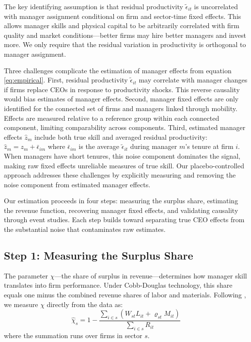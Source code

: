 \documentclass[11pt,a4paper]{article}
\begin{document}
The key identifying assumption is that residual productivity $\tilde{\epsilon}_{it}$ is uncorrelated with manager assignment conditional on firm and sector-time fixed effects. This allows manager skills and physical capital to be arbitrarily correlated with firm quality and market conditions—better firms may hire better managers and invest more. We only require that the residual variation in productivity is orthogonal to manager assignment.

Three challenges complicate the estimation of manager effects from equation \eqref{eq:empirical}. First, residual productivity $\tilde{\epsilon}_{it}$ may correlate with manager changes if firms replace CEOs in response to productivity shocks. This reverse causality would bias estimates of manager effects. Second, manager fixed effects are only identified for the connected set of firms and managers linked through mobility. Effects are measured relative to a reference group within each connected component, limiting comparability across components. Third, estimated manager effects $\hat{z}_m$ include both true skill and averaged residual productivity: $\hat{z}_m = z_m + \bar{\epsilon}_{im}$ where $\bar{\epsilon}_{im}$ is the average $\tilde{\epsilon}_{it}$ during manager $m$'s tenure at firm $i$. When managers have short tenures, this noise component dominates the signal, making raw fixed effects unreliable measures of true skill. Our placebo-controlled approach addresses these challenges by explicitly measuring and removing the noise component from estimated manager effects.

Our estimation proceeds in four steps: measuring the surplus share, estimating the revenue function, recovering manager fixed effects, and validating causality through event studies. Each step builds toward separating true CEO effects from the substantial noise that contaminates raw estimates.

\subsection{Step 1: Measuring the Surplus Share}

The parameter $\chi$—the share of surplus in revenue—determines how manager skill translates into firm performance. Under Cobb-Douglas technology, this share equals one minus the combined revenue shares of labor and materials. Following \citet{Gandhi2020-nu}, we measure $\chi$ directly from the data as:
\begin{equation}
\hat{\chi}_s = 1 - \frac{\sum_{i \in s}(W_{st}L_{it} + \varrho_{st}M_{it})}{\sum_{i \in s} R_{it}}
\end{equation}
where the summation runs over firms in sector $s$.
\end{document}
